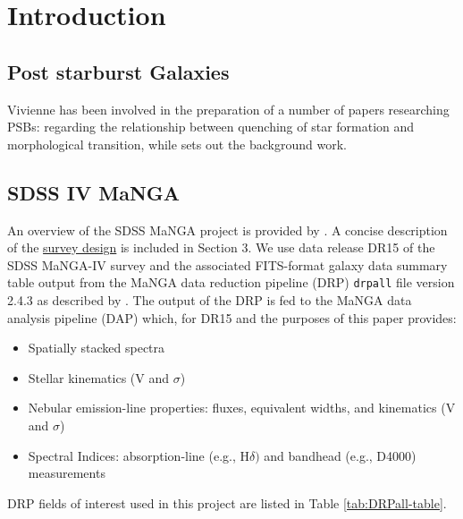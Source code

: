 \section{Introduction}
\label{sec:introduction}

% 

\subsection{Post starburst Galaxies}
Vivienne has been involved in the preparation of a number of papers researching PSBs: \citet{2017MNRAS.472.1401A} regarding the relationship between quenching of star formation and morphological transition, while \citet{2016MNRAS.463..832W} sets out the background work.

\subsection{SDSS IV MaNGA}
An overview of the SDSS MaNGA project is provided by \citet{2015ApJ...798....7B}. A concise description of the \href{https://iopscience.iop.org/article/10.1088/0004-637X/798/1/7/meta#apj504473s3}{survey design} is included in Section 3. We use data release DR15 of the SDSS MaNGA-IV survey \citep{2019ApJS..240...23A} and the associated FITS-format galaxy data summary table output from the MaNGA data reduction pipeline (DRP) \texttt{drpall} file version 2.4.3 as described by \citet{2016AJ....152...83L}. The output of the DRP is fed to the MaNGA data analysis pipeline (DAP) which, for DR15 and the purposes of this paper provides:
\begin{itemize}
    \item Spatially stacked spectra
    \item Stellar kinematics (V and $\sigma$)
    \item Nebular emission-line properties: fluxes, equivalent widths, and kinematics (V and $\sigma$)
    \item Spectral Indices: absorption-line (e.g., H$\delta)$ and bandhead (e.g., D4000) measurements
\end{itemize}

DRP fields of interest used in this project are listed in Table \ref{tab:DRPall-table}.

